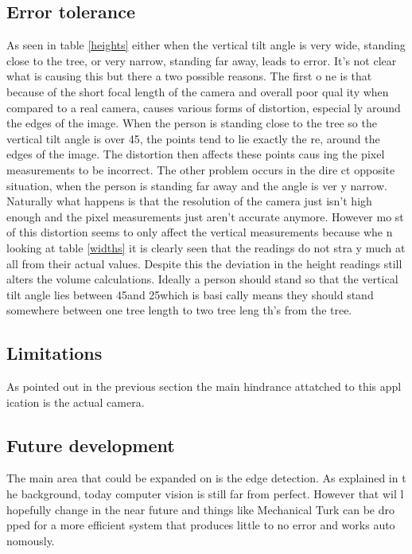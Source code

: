 \subsection{Error tolerance}
As seen in table \ref{heights} either when the vertical tilt angle is very wide,
 standing close to the tree, or very narrow, standing far away, leads to error. 
It's not clear what is causing this but there a two possible reasons. The first o
ne is that because of the short focal length of the camera and overall poor qual
ity when compared to a real camera, causes various forms of distortion, especial
ly around the edges of the image. When the person is standing close to the tree 
so the vertical tilt angle is over 45\degree, the points tend to lie exactly the
re, around the edges of the image. The distortion then affects these points caus
ing the pixel measurements to be incorrect. The other problem occurs in the dire
ct opposite situation, when the person is standing far away and the angle is ver
y narrow. Naturally what happens is that the resolution of the camera just isn't
 high enough and the pixel measurements just aren't accurate anymore. However mo
st of this distortion seems to only affect the vertical measurements because whe
n looking at table \ref{widths} it is clearly seen that the readings do not stra
y much at all from their actual values. Despite this the deviation in the height
 readings still alters the volume calculations. Ideally a person should stand so
 that the vertical tilt angle lies between 45\degree and 25\degree which is basi
cally means they should stand somewhere between one tree length to two tree leng
th's from the tree.
\subsection{Limitations}
As pointed out in the previous section the main hindrance attatched to this appl
ication is the actual camera. 
\subsection{Future development}
The main area that could be expanded on is the edge detection. As explained in t
he background, today computer vision is still far from perfect. However that wil
l hopefully change in the near future and things like Mechanical Turk can be dro
pped for a more efficient system that produces little to no error and works auto
nomously.

